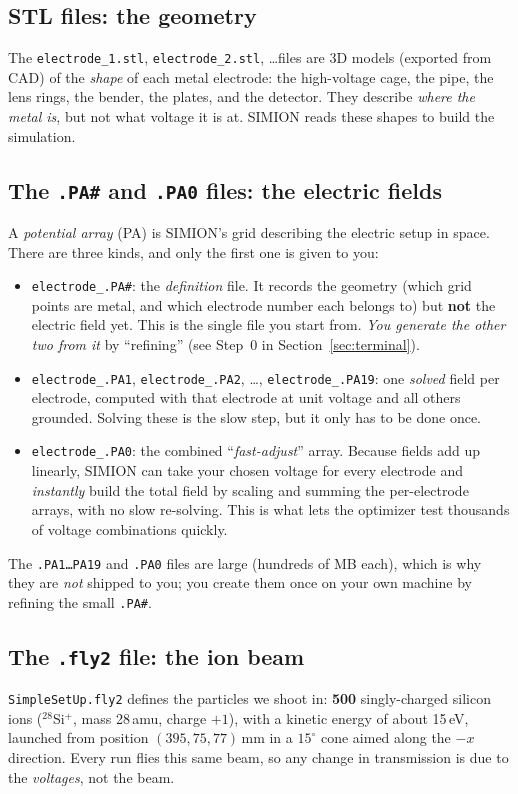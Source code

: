\documentclass[11pt]{article}
\begin{document}
\subsection{STL files: the geometry}
The \texttt{electrode\_1.stl}, \texttt{electrode\_2.stl}, \dots files are 3D
models (exported from CAD) of the \emph{shape} of each metal electrode: the
high-voltage cage, the pipe, the lens rings, the bender, the plates, and the
detector. They describe \emph{where the metal is}, but not what voltage it is
at. SIMION reads these shapes to build the simulation.

\subsection{The \texttt{.PA\#} and \texttt{.PA0} files: the electric fields}
A \emph{potential array} (PA) is SIMION's grid describing the electric setup in
space. There are three kinds, and only the first one is given to you:
\begin{itemize}[nosep]
  \item \texttt{electrode\_.PA\#}: the \emph{definition} file. It records the
        geometry (which grid points are metal, and which electrode number
        each belongs to) but \textbf{not} the electric field yet. This is the
        single file you start from. \emph{You generate the other two from it} by
        ``refining'' (see Step~0 in Section~\ref{sec:terminal}).
  \item \texttt{electrode\_.PA1}, \texttt{electrode\_.PA2}, \dots,
        \texttt{electrode\_.PA19}: one \emph{solved} field per electrode,
        computed with that electrode at unit voltage and all others grounded.
        Solving these is the slow step, but it only has to be done once.
  \item \texttt{electrode\_.PA0}: the combined ``\emph{fast-adjust}'' array.
        Because fields add up linearly, SIMION can take your chosen voltage for
        every electrode and \emph{instantly} build the total field by scaling
        and summing the per-electrode arrays, with no slow re-solving. This is
        what lets the optimizer test thousands of voltage combinations quickly.
\end{itemize}
The \texttt{.PA1\dots PA19} and \texttt{.PA0} files are large (hundreds of MB
each), which is why they are \emph{not} shipped to you; you create them once
on your own machine by refining the small \texttt{.PA\#}.

\subsection{The \texttt{.fly2} file: the ion beam}
\texttt{SimpleSetUp.fly2} defines the particles we shoot in: \textbf{500}
singly-charged silicon ions ($^{28}$Si$^+$, mass 28\,amu, charge $+1$), with a
kinetic energy of about 15\,eV, launched from position $(395, 75, 77)$\,mm in a
$15^\circ$ cone aimed along the $-x$ direction. Every run flies this same beam,
so any change in transmission is due to the \emph{voltages}, not the beam.
\end{document}
